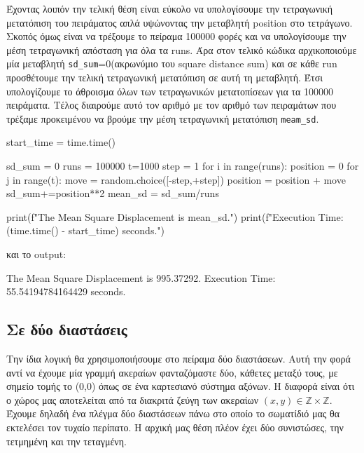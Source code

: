 \gr
Έχοντας λοιπόν την τελική θέση είναι εύκολο να υπολογίσουμε την τετραγωνική μετατόπιση του πειράματος απλά υψώνοντας την μεταβλητή {\en position} στο τετράγωνο. Σκοπός όμως είναι να τρέξουμε το πείραμα 100000 φορές και να υπολογίσουμε την μέση τετραγωνική απόσταση για όλα τα {\en runs}. Άρα στον τελικό κώδικα αρχικοποιούμε μία μεταβλητή {\en \texttt{sd\_sum}}=0(ακρωνύμιο του {\en square distance sum}) και σε κάθε {\en run} προσθέτουμε την τελική τετραγωνική μετατόπιση σε αυτή τη μεταβλητή. Έτσι υπολογίζουμε το άθροισμα όλων των τετραγωνικών μετατοπίσεων για τα 100000 πειράματα. Τέλος διαιρούμε αυτό τον αριθμό με τον αριθμό των πειραμάτων που τρέξαμε προκειμένου να βρούμε την μέση τετραγωνική μετατόπιση {\en \texttt{meam\_sd}}.


\en
\begin{python}
start_time = time.time()

sd_sum = 0
runs = 100000
t=1000
step = 1
for i in range(runs):
    position = 0
    for j in range(t):
        move = random.choice([-step,+step])
        position = position + move
    sd_sum+=position**2
mean_sd = sd_sum/runs

print(f"The Mean Square Displacement is {mean_sd}.")
print(f"Execution Time: {(time.time() - start_time)} seconds.")
\end{python}
\gr 
και το {\en output}:
\en
\begin{python}
The Mean Square Displacement is 995.37292.
Execution Time: 55.54194784164429 seconds.
\end{python}
\gr
\subsection{Σε δύο διαστάσεις}
Την ίδια λογική θα χρησιμοποιήσουμε στο πείραμα δύο διαστάσεων. Αυτή την φορά αντί να έχουμε μία γραμμή ακεραίων φανταζόμαστε δύο, κάθετες μεταξύ τους, με σημείο τομής το (0,0) όπως σε ένα καρτεσιανό σύστημα αξόνων. Η διαφορά είναι ότι ο χώρος μας αποτελείται από τα διακριτά ζεύγη των ακεραίων $(x,y) \in \mathbb{Z} \times \mathbb{Z} $. Έχουμε δηλαδή ένα πλέγμα δύο διαστάσεων πάνω στο οποίο το σωματίδιό μας θα εκτελέσει τον τυχαίο περίπατο. Η αρχική μας θέση πλέον έχει δύο συνιστώσες, την τετμημένη και την τεταγμένη. 

